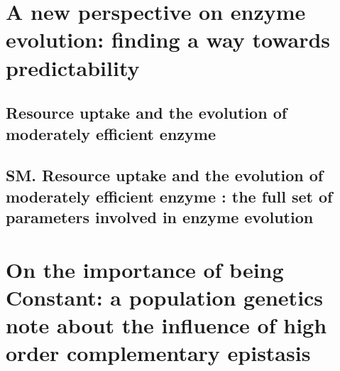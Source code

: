 \documentclass[11pt, 			%
               twoside,         %
			  ]{report}
\begin{document}

\section{A new perspective on enzyme evolution: finding a way towards predictability}\label{Enzyme-Evolution}

\subsection{Resource uptake and the evolution of moderately efficient enzyme}



\subsection{SM. Resource uptake and the evolution of moderately efficient enzyme : the full set of parameters involved in enzyme evolution}



\pagebreak

\section[A population genetics note about high order complementary epistasis]{On the importance of being Constant: a population genetics note about the influence of high order complementary epistasis}




\end{document}
